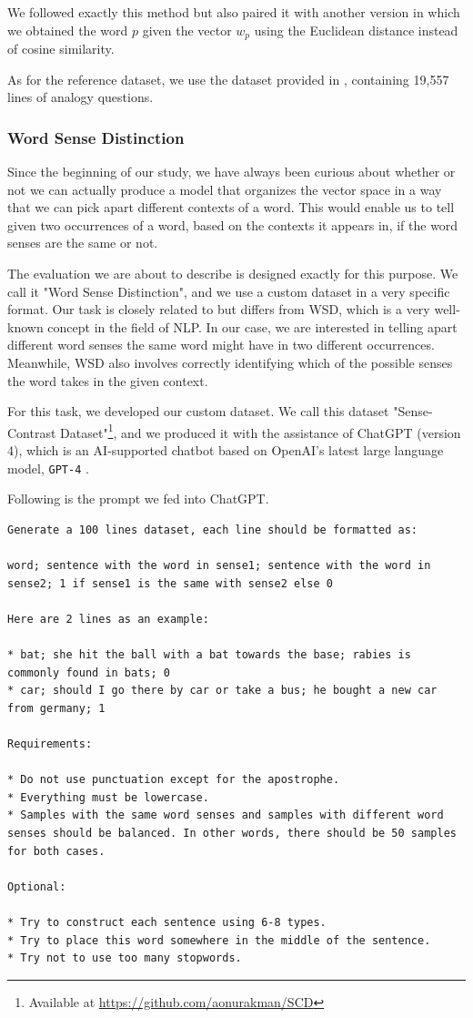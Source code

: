 We followed exactly this method but also paired it with another version in which we obtained the word $p$ given the vector $w_p$ using the Euclidean distance instead of cosine similarity.

As for the reference dataset, we use the dataset provided in \cite{w2v}, containing 19,557 lines of analogy questions.


\subsubsection{Word Sense Distinction}

Since the beginning of our study, we have always been curious about whether or not we can actually produce a model that organizes the vector space in a way that we can pick apart different contexts of a word. This would enable us to tell given two occurrences of a word, based on the contexts it appears in, if the word senses are the same or not.

The evaluation we are about to describe is designed exactly for this purpose. We call it "Word Sense Distinction", and we use a custom dataset in a very specific format. Our task is closely related to but differs from \ac{WSD}, which is a very well-known concept in the field of \ac{NLP}. In our case, we are interested in telling apart different word senses the same word might have in two different occurrences. Meanwhile, \ac{WSD} also involves correctly identifying which of the possible senses the word takes in the given context.

For this task, we developed our custom dataset. We call this dataset "Sense-Contrast Dataset"\footnote{Available at \url{https://github.com/aonurakman/SCD}}, and we produced it with the assistance of ChatGPT (version 4), which is an \ac{AI}-supported chatbot based on OpenAI's latest large language model, \verb|GPT-4| \cite{gpt4}. 

Following is the prompt we fed into ChatGPT.

\begin{lstlisting}[numbers=none, caption=Prompt used in the generation of Sense-Contrast Dataset]
Generate a 100 lines dataset, each line should be formatted as: 

word; sentence with the word in sense1; sentence with the word in sense2; 1 if sense1 is the same with sense2 else 0

Here are 2 lines as an example:

* bat; she hit the ball with a bat towards the base; rabies is commonly found in bats; 0
* car; should I go there by car or take a bus; he bought a new car from germany; 1

Requirements:

* Do not use punctuation except for the apostrophe.
* Everything must be lowercase.
* Samples with the same word senses and samples with different word senses should be balanced. In other words, there should be 50 samples for both cases.

Optional:

* Try to construct each sentence using 6-8 types.
* Try to place this word somewhere in the middle of the sentence.
* Try not to use too many stopwords.
\end{lstlisting}

